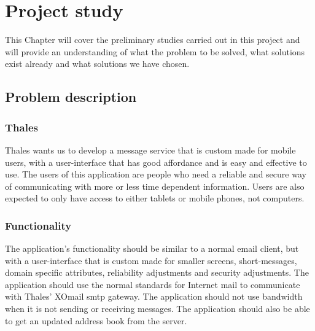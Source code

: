 \chapter{Project study}

This Chapter will cover the preliminary studies carried out in this project and will provide an understanding of what the problem to be solved, what solutions exist already and what solutions we have chosen.

\section{Problem description}

\subsection{Thales}
Thales wants us to develop a message service that is custom made for mobile users, with a user-interface that has good affordance and is easy and effective to use.
\newline
\newline
The users of this application are people who need a reliable and secure way of communicating with more or less time dependent information. Users are also expected to only have access to either tablets or mobile phones, not computers.

\subsection{Functionality}
The application’s functionality should be similar to a normal email client, but with a user-interface that is custom made for smaller screens, short-messages, domain specific attributes, reliability adjustments and security adjustments. The application should use the normal standards for Internet mail to communicate with Thales’ XOmail \gls{smtp} gateway.
\newline
\newline
The application should not use bandwidth when it is not sending or receiving messages. The application should also be able to get an updated address book from the server.

